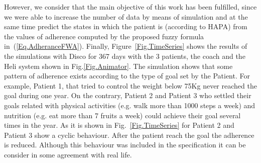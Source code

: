 \documentclass{llncs}
\begin{document}
However, we consider that the main objective of this work has been fulfilled, since we were able to increase the number of data by means of simulation and at the same time predict the states in which the patient is (according to HAPA) from the values of adherence computed by the proposed fuzzy formula in~(\ref{Eq.AdheranceFWA}). Finally, Figure~\ref{Fig.TimeSeries} shows the results of the simulations with Disco for 367 days with the 3 patients, the coach and the Heli system shown in Fig.\ref{Fig.Animator}. The simulation shows that some pattern of adherence exists according to the type of goal set by the Patient. For example, Patient 1, that tried to control the weight below 75Kg never reached the goal during one year. On the contrary, Patient 2 and Patient 3 who settled their goals related with physical activities (e.g. walk more than 1000 steps a week) and nutrition (e.g. eat more than 7 fruits a week) could achieve their goal several times in the year.  As it is shown in Fig.~\ref{Fig.TimeSeries} for Patient 2 and Patient 3 show a cyclic behaviour. After the patient reach the goal the adherence is reduced. Although this behaviour was included in the specification it can be consider in some agreement with real life. 
\end{document}
